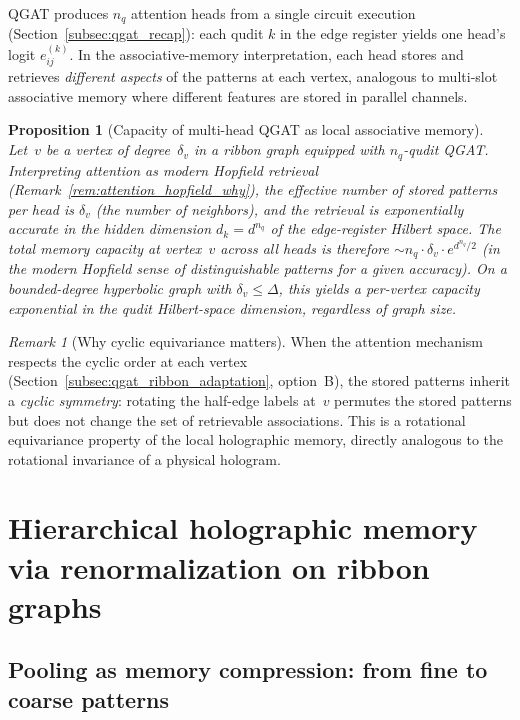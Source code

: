 \documentclass[11pt,oneside]{amsbook}
\numberwithin{equation}{section}
\theoremstyle{plain}
\newtheorem{proposition}[theorem]{Proposition}
\theoremstyle{definition}
\theoremstyle{remark}
\newtheorem{remark}[theorem]{Remark}
\begin{document}
QGAT \cite{Ning2025QGAT} produces $n_q$ attention heads from a single circuit execution
(Section~\ref{subsec:qgat_recap}): each qudit $k$ in the edge register yields one head's logit
$e_{ij}^{(k)}$.  In the associative-memory interpretation, each head stores and retrieves
\emph{different aspects} of the patterns at each vertex, analogous to multi-slot associative
memory where different features are stored in parallel channels.

\begin{proposition}[Capacity of multi-head QGAT as local associative memory]
\label{prop:qgat_capacity}
Let~$v$ be a vertex of degree~$\delta_v$ in a ribbon graph equipped with $n_q$-qudit QGAT.
Interpreting attention as modern Hopfield retrieval (Remark~\ref{rem:attention_hopfield_why}),
the effective number of stored patterns per head is $\delta_v$ (the number of neighbors),
and the retrieval is exponentially accurate in the hidden dimension
$d_k=d^{n_q}$ of the edge-register Hilbert space.
The total memory capacity at vertex~$v$ across all heads is therefore
$\sim n_q\cdot\delta_v\cdot e^{d^{n_q}/2}$ (in the modern Hopfield sense of distinguishable
patterns for a given accuracy).
On a bounded-degree hyperbolic graph with $\delta_v\le\Delta$, this yields a per-vertex
capacity exponential in the qudit Hilbert-space dimension, regardless of graph size.
\end{proposition}

\begin{remark}[Why cyclic equivariance matters]
When the attention mechanism respects the cyclic order at each vertex
(Section~\ref{subsec:qgat_ribbon_adaptation}, option~B), the stored patterns inherit a
\emph{cyclic symmetry}: rotating the half-edge labels at~$v$ permutes the stored patterns
but does not change the set of retrievable associations.
This is a rotational equivariance property of the local holographic memory, directly
analogous to the rotational invariance of a physical hologram.
\end{remark}


\section{Hierarchical holographic memory via renormalization on ribbon graphs}
\label{sec:hierarchical_holographic}

\subsection{Pooling as memory compression: from fine to coarse patterns}
\end{document}

